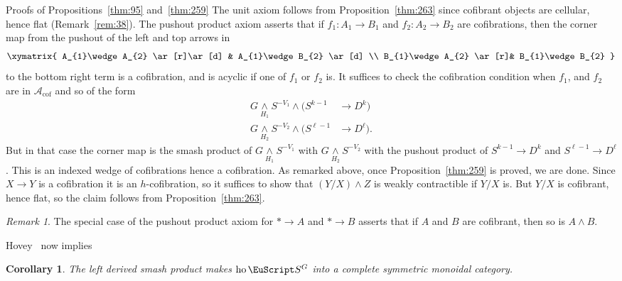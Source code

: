 \documentclass{amsart}
\newtheorem{cor}[equation]{Corollary}
\newtheorem{rem}[equation]{Remark}
\theoremstyle{definition}
\theoremstyle{remark}
\newtheorem{rem}[equation]{Remark}
\newenvironment{pf*}[1]{\bigskip{\em #1:\/}}{\qed\medskip}
\newcommand{\spectra}{\EuScript S}
\DeclareMathOperator{\ho}{ho}
\newcommand{\smashove}[1]{\underset{#1}{\wedge}}
\newcommand{\ugspectra}[1]{\spectra^{#1}}
\newcommand{\gencof}{\mathcal A_{\text{cof}}}
\begin{document}
\begin{pf*}{Proofs of Propositions~\ref{thm:95} and~\ref{thm:259}}
The unit axiom follows from Proposition~\ref{thm:263} since cofibrant
objects are cellular, hence flat (Remark~\ref{rem:38}).  The
pushout product axiom asserts that if $f_{1}:A_{1}\to B_{1}$ and
$f_{2}:A_{2}\to B_{2}$ are cofibrations, then the corner map from the
pushout of the left and top arrows in
\begin{equation}
\label{eq:171}
\xymatrix{
A_{1}\wedge A_{2}  \ar[r]\ar[d] & A_{1}\wedge B_{2}
\ar[d] \\
B_{1}\wedge A_{2} \ar[r]& B_{1}\wedge B_{2}
}
\end{equation}
to the bottom right term is a cofibration, and is acyclic if one of
$f_{1}$ or $f_{2}$ is.  It suffices to check the cofibration condition
when $f_{1}$, and $f_{2}$ are in $\gencof$ and so of the form
\begin{align*}
G\smashove{H_{1}}S^{-V_{1}}\wedge\big(S^{k-1} &\to D^{k}\big) \\
G\smashove{H_{2}}S^{-V_{2}}\wedge\big(S^{\ell-1} &\to D^{\ell}\big).
\end{align*}
But in that case the corner map is the smash product of
$G\smashove{H_{1}}S^{-V_{1}}$ with $G\smashove{H_{2}}S^{-V_{2}}$ with
the pushout product of $S^{k-1}\to D^{k}$ and $S^{\ell-1}\to
D^{\ell}$.  This is an indexed wedge of cofibrations hence a
cofibration.  As remarked above, once Proposition~\ref{thm:259} is
proved, we are done.  Since $X\to Y$ is a cofibration it is an
$h$-cofibration, so it suffices to show that $(Y/X)\wedge Z$ is weakly
contractible if $Y/X$ is.  But $Y/X$ is cofibrant, hence flat, so the
claim follows from Proposition~\ref{thm:263}.
\end{pf*}

\begin{rem}
\label{rem:49} The special case of the pushout product axiom for $\ast
\to A$ and $\ast \to B$ asserts that if $A$ and $B$ are cofibrant,
then so is $A\wedge B$.
\end{rem}

Hovey~\cite[Theorem~4.3.2]{hovey99:_model} now implies
\begin{cor}
\label{thm:113}
The left derived smash product makes $\ho\ugspectra{G}$ into a
complete symmetric monoidal category.
\end{cor}
\end{document}
